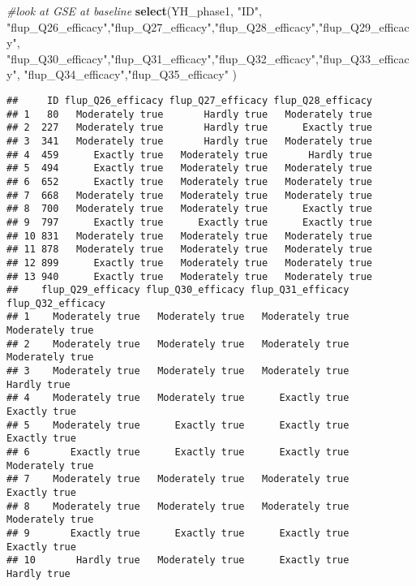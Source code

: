 \documentclass[]{article}
\newenvironment{Shaded}{\begin{snugshade}}{\end{snugshade}}
\newcommand{\KeywordTok}[1]{\textcolor[rgb]{0.13,0.29,0.53}{\textbf{#1}}}
\newcommand{\StringTok}[1]{\textcolor[rgb]{0.31,0.60,0.02}{#1}}
\newcommand{\CommentTok}[1]{\textcolor[rgb]{0.56,0.35,0.01}{\textit{#1}}}
\newcommand{\NormalTok}[1]{#1}
\begin{document}
\begin{Shaded}
\begin{Highlighting}[]
\CommentTok{#look at GSE at baseline}
\KeywordTok{select}\NormalTok{(YH_phase1, }\StringTok{"ID"}\NormalTok{, }
 \StringTok{"flup_Q26_efficacy"}\NormalTok{,}\StringTok{"flup_Q27_efficacy"}\NormalTok{,}\StringTok{"flup_Q28_efficacy"}\NormalTok{,}\StringTok{"flup_Q29_efficacy"}\NormalTok{,}
 \StringTok{"flup_Q30_efficacy"}\NormalTok{,}\StringTok{"flup_Q31_efficacy"}\NormalTok{,}\StringTok{"flup_Q32_efficacy"}\NormalTok{,}\StringTok{"flup_Q33_efficacy"}\NormalTok{,}
 \StringTok{"flup_Q34_efficacy"}\NormalTok{,}\StringTok{"flup_Q35_efficacy"}
\NormalTok{)}
\end{Highlighting}
\end{Shaded}

\begin{verbatim}
##     ID flup_Q26_efficacy flup_Q27_efficacy flup_Q28_efficacy
## 1   80   Moderately true       Hardly true   Moderately true
## 2  227   Moderately true       Hardly true      Exactly true
## 3  341   Moderately true       Hardly true   Moderately true
## 4  459      Exactly true   Moderately true       Hardly true
## 5  494      Exactly true   Moderately true   Moderately true
## 6  652      Exactly true   Moderately true   Moderately true
## 7  668   Moderately true   Moderately true   Moderately true
## 8  700   Moderately true   Moderately true      Exactly true
## 9  797      Exactly true      Exactly true      Exactly true
## 10 831   Moderately true   Moderately true   Moderately true
## 11 878   Moderately true   Moderately true   Moderately true
## 12 899      Exactly true   Moderately true   Moderately true
## 13 940      Exactly true   Moderately true   Moderately true
##    flup_Q29_efficacy flup_Q30_efficacy flup_Q31_efficacy flup_Q32_efficacy
## 1    Moderately true   Moderately true   Moderately true   Moderately true
## 2    Moderately true   Moderately true   Moderately true   Moderately true
## 3    Moderately true   Moderately true   Moderately true       Hardly true
## 4    Moderately true   Moderately true      Exactly true      Exactly true
## 5    Moderately true      Exactly true      Exactly true      Exactly true
## 6       Exactly true      Exactly true      Exactly true   Moderately true
## 7    Moderately true   Moderately true   Moderately true      Exactly true
## 8    Moderately true   Moderately true   Moderately true   Moderately true
## 9       Exactly true      Exactly true      Exactly true      Exactly true
## 10       Hardly true   Moderately true      Exactly true       Hardly true

\end{verbatim}
\end{document}
